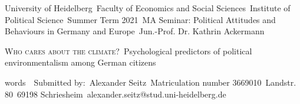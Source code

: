 \thispagestyle{empty}
\noindent
University of Heidelberg\
Faculty of Economics and Social Sciences\
Institute of Political Science\
Summer Term 2021\
MA Seminar: Political Attitudes and Behaviours in Germany and Europe\
Jun.-Prof. Dr. Kathrin Ackermann\
\begin{center}
\vspace*{6cm}
\huge\textsc{Who cares about the climate?}\
\LARGE{Psychological predictors of political environmentalism among German citizens}\
\vspace*{6.5cm}
\end{center}
\noindent
5797 words\
\
Submitted by:\
Alexander Seitz\
Matriculation number 3669010\
Landstr. 80\
69198 Schriesheim\
alexander.seitz@stud.uni-heidelberg.de\
